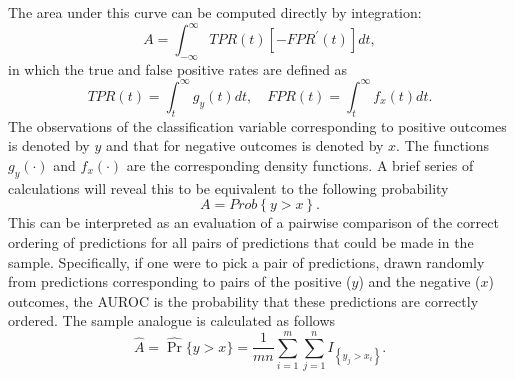 The area under this curve can be computed directly by integration:
%
\begin{equation}
    A = \int_{-\infty}^{\infty} TPR(t) [-FPR^{\prime}(t)] dt,
\end{equation}
%
\noindent in which the true and false positive rates are defined as
%
\begin{equation}
    TPR(t) = \int_{t}^{\infty} g_y(t) dt, \quad FPR(t) = \int_{t}^{\infty} f_x(t) dt.
\end{equation}
%
The observations of the classification variable corresponding to positive outcomes is denoted by $y$ and that for negative outcomes is denoted by $x$. The functions $g_y(\cdot)$ and $f_x(\cdot)$ are the corresponding density functions.
%
A brief series of calculations will reveal this to be equivalent to the following probability
%
\begin{equation}
    A = Prob{\left\{ y > x \right\}}.
\end{equation}
%
This can be interpreted as an evaluation of a pairwise comparison of the correct ordering of predictions for all pairs of predictions that could be made in the sample.
%
Specifically, if one were to pick a pair of predictions, drawn randomly from predictions corresponding to pairs of the positive ($y$) and the negative ($x$) outcomes, the AUROC is the probability that these predictions are correctly ordered.
%
The sample analogue is calculated as follows
%
\begin{equation} \label{eqn:auroc}
    \hat{A} = \hat{\Pr} \{ y > x \} = \frac{1}{m n} \sum_{i = 1}^{m} \sum_{j = 1}^{n} I_{\left\{ y_j > x_i \right\}}.
\end{equation}
%



